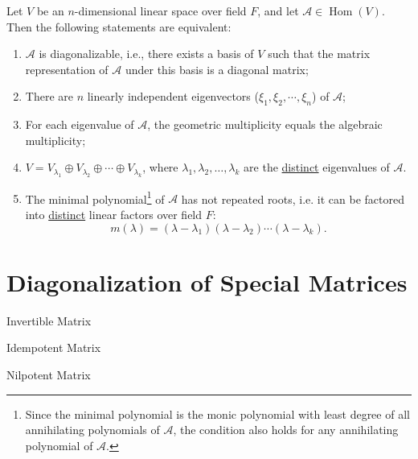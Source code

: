 \documentclass[11pt]{../../TexTemplate/elegantbook} %
\begin{document}
\begin{theorem}
    Let \( V \) be an \( n \)-dimensional linear space over field \( F \),
    and let \( \mathcal{A}\in \operatorname{Hom}(V) \).
    Then the following statements are equivalent:
    \begin{enumerate}
        \item \( \mathcal{A} \) is diagonalizable, i.e., there exists a basis of \( V \)
            such that the matrix representation of \( \mathcal{A} \) under this basis is a diagonal matrix;
        \item There are \( n \) linearly independent eigenvectors (\( \xi_{1}, \xi_{2}, \cdots, \xi_{n} \)) of \( \mathcal{A} \);
        \item For each eigenvalue of \( \mathcal{A} \), the geometric multiplicity equals the algebraic multiplicity;
        \item \( V = V_{\lambda_1} \oplus V_{\lambda_2} \oplus \cdots \oplus V_{\lambda_k} \),
            where \( \lambda_1, \lambda_2, \dots, \lambda_k \) are the \underline{distinct} eigenvalues of \( \mathcal{A} \).
        \item The minimal polynomial\footnote{
            Since the minimal polynomial is the monic polynomial with least degree 
            of all annihilating polynomials of \( \mathcal{A} \),
            the condition also holds for any annihilating polynomial of \( \mathcal{A} \).
        } of \( \mathcal{A} \) has not repeated roots, 
            i.e. it can be factored into \underline{distinct} linear factors over field \( F \):
            \[
            m(\lambda) = (\lambda - \lambda_1)(\lambda - \lambda_2) \cdots (\lambda - \lambda_k).
            \]
    \end{enumerate}
\end{theorem}

\section{Diagonalization of Special Matrices}
\begin{leftbarTitle}{Invertible Matrix}\end{leftbarTitle}

\begin{leftbarTitle}{Idempotent Matrix}\end{leftbarTitle}

\begin{leftbarTitle}{Nilpotent Matrix}\end{leftbarTitle}
\end{document}
